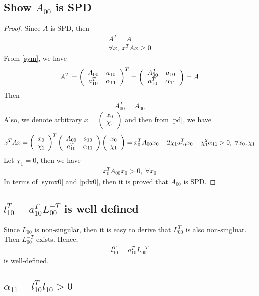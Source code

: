 \documentclass[11pt,a4paper]{article}
\begin{document}
\subsection{Show $A_{00}$ is SPD}
\begin{proof}
    Since $A$ is SPD, then
    \begin{align}
        A^T = A \label{sym} \\
        \forall x,\ x^T A x \geq 0 \label{pd}
    \end{align}
    From \eqref{sym}, we have
    \begin{align}
        A^T = \left( \begin{array}{cc} A_{00} & a_{10} \\ a_{10}^T & \alpha_{11} \end{array} \right)^T = \left( \begin{array}{cc} A_{00}^T & a_{10} \\ a_{10}^T & \alpha_{11} \end{array} \right) = A
    \end{align}
    Then 
    \begin{align} \label{symx0}
        A_{00}^T = A_{00} \tag{symmetry of A}
    \end{align}
    Also, we denote arbitrary $x = \left( \begin{array}{c}
            x_{0}  \\ \chi_{1} 
        \end{array} \right)$ and then from \eqref{pd}, we have
    \begin{align}
        x^T A x = \left( \begin{array}{c} x_{0} \\ \chi_{1} \end{array} \right)^T \left( \begin{array}{cc} A_{00} & a_{10} \\ a_{10}^T & \alpha_{11} \end{array} \right) \left( \begin{array}{c} x_{0} \\ \chi_{1} \end{array} \right) =  x_0^T A_{00} x_0 + 2\chi_1 a_{10}^T
        x_0 + \chi_1^2 \alpha_{11}  > 0,\ \forall x_0, \chi_1
    \end{align}
    Let $\chi_1 = 0$, then we have
    \begin{align} \label{pdx0}
        x_0^T A_{00} x_0  > 0,\ \forall x_0 \tag{positive definiteness}
    \end{align}
    In terms of \eqref{symx0} and \eqref{pdx0}, then it is proved that
    $A_{00}$ is SPD.
\end{proof}
\subsection{$l_{10}^T = a_{10}^T L_{00}^{-T}$ is well defined}
Since $L_{00}$ is non-singular, then it is easy to derive that $L_{00}^T$ is also non-singluar.
Then $L_{00}^{-T}$ exists. Hence,
\begin{align}
    l_{10}^T = a_{10}^T L_{00}^{-T}
\end{align}
is well-defined. 

\subsection{$\alpha_{11} - l_{10}^T l_{10} > 0$}
\end{document}
